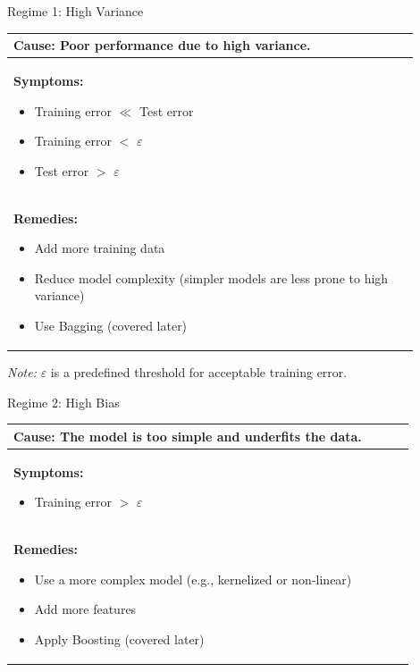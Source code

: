 \documentclass[serif, aspectratio=169]{beamer}
\begin{document}
\begin{frame}{Regime 1: High Variance}
\centering
\renewcommand{\arraystretch}{1.3}
\begin{tabular}{|p{0.9\linewidth}|}
\hline
\textbf{Cause:} Poor performance due to high variance. \\ \hline

\textbf{Symptoms:}
\begin{itemize}
    \item Training error $\ll$ Test error
    \item Training error $<$ $\varepsilon$
    \item Test error $>$ $\varepsilon$
\end{itemize} \\ \hline

\textbf{Remedies:}
\begin{itemize}
    \item Add more training data
    \item Reduce model complexity (simpler models are less prone to high variance)
    \item Use Bagging (covered later)
\end{itemize} \\ \hline
\end{tabular}


\vspace{0.3cm}
\textit{Note:} $\varepsilon$ is a predefined threshold for acceptable training error.
\end{frame}


\begin{frame}{Regime 2: High Bias}
\centering
\renewcommand{\arraystretch}{1.3}
\begin{tabular}{|p{0.9\linewidth}|}
\hline
\textbf{Cause:} The model is too simple and underfits the data. \\ \hline

\textbf{Symptoms:}
\begin{itemize}
    \item Training error $>$ $\varepsilon$
\end{itemize} \\ \hline

\textbf{Remedies:}
\begin{itemize}
    \item Use a more complex model (e.g., kernelized or non-linear)
    \item Add more features
    \item Apply Boosting (covered later)
\end{itemize} \\ \hline
\end{tabular}
\end{frame}
\end{document}
